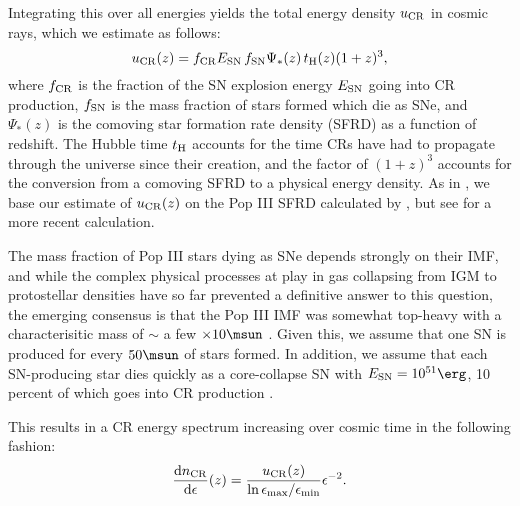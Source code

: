 Integrating this over all energies yields the total energy density $u_{\rm \small CR}$ in cosmic rays, which we estimate as follows:
\begin{equation}
u_{\rm \small CR}(z) = f_{\rm \small CR} E_{\rm \small SN}\, f_{\rm \small SN} \Psi_{*}(z)\, t_{\rm \small H}(z) (1+z)^3,
\end{equation}
where $f_{\rm \small CR}$ is the fraction of the SN explosion energy $E_{\rm \small SN}$ going into CR production, $f_{\rm \small SN}$ is the mass fraction of stars formed which die as SNe, and $\Psi_{*}(z)$ is the comoving star formation rate density (SFRD) as a function of redshift.  The Hubble time $t_{\rm \small H}$ accounts for the time CRs have had to propagate through the universe since their creation, and the factor of $(1+z)^3$ accounts for the conversion from a comoving SFRD to a physical energy density. As in \citet{Hummeletal2015}, we base our estimate of $u_{\rm \small CR}(z)$ on the Pop III SFRD calculated by \citet{GreifBromm2006}, but see \citet{Campisietal2011} for a more recent calculation.

 The mass fraction of Pop III stars dying as SNe depends strongly on their IMF, and while the complex physical processes at play in gas collapsing from IGM to protostellar densities have so far prevented a definitive answer to this question, the emerging consensus is that the Pop III IMF was somewhat top-heavy with a characterisitic mass of $\sim$ a few $\times 10\msun$ \citep{Bromm2013}.  Given this, we assume that one SN is produced for every $50\msun$ of stars formed.  In addition, we assume that each SN-producing star dies quickly as a core-collapse SN with $E_{\rm \small SN} = 10^{51}\erg$, 10 percent of which goes into CR production \citep[e.g.,][]{Ruderman1974}.
 
 This results in a CR energy spectrum increasing over cosmic time in the following fashion:
 \begin{equation}
 \frac{{\rm d}n_{\rm \small CR}}{{\rm d}\epsilon}(z) = \frac{u_{\rm \small CR}(z)}{{\rm ln}\,\epsilon_{\rm max}{\large /}\epsilon_{\rm min}}  \epsilon^{-2}.
 \end{equation}